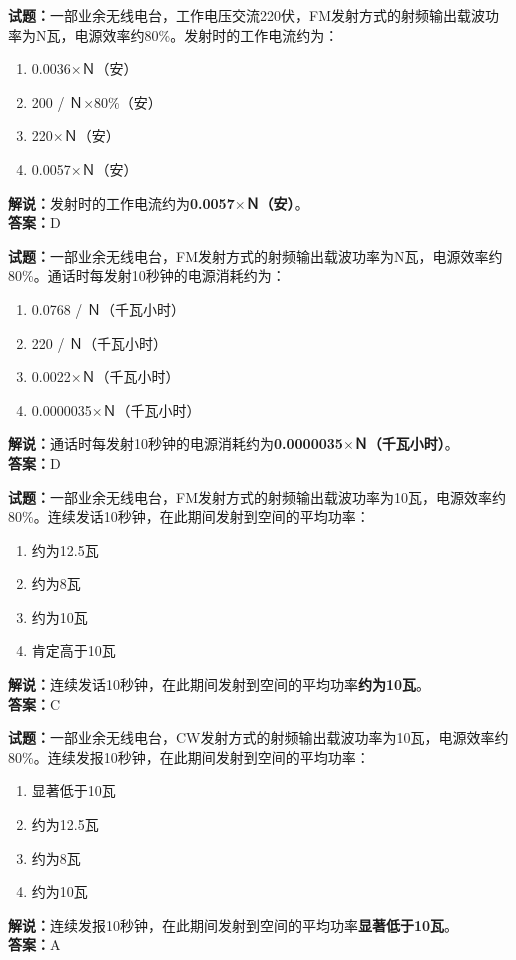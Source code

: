 \documentclass{ctexbook}
\begin{document}
\bigskip


\noindent\textbf{试题：}一部业余无线电台，工作电压交流220伏，FM发射方式的射频输出载波功率为N瓦，电源效率约80\%。发射时的工作电流约为：
\begin{enumerate}[leftmargin=3em]
\item 0.0036$\times$Ｎ（安）
\item 200 / Ｎ$\times$80\%（安）%
\item 220$\times$Ｎ（安）
\item 0.0057$\times$Ｎ（安）
\end{enumerate}
\noindent\textbf{解说：}发射时的工作电流约为\textbf{0.0057$\times$Ｎ（安）}。\\\noindent\textbf{答案：}D




\bigskip


\noindent\textbf{试题：}一部业余无线电台，FM发射方式的射频输出载波功率为N瓦，电源效率约80\%。通话时每发射10秒钟的电源消耗约为：
\begin{enumerate}[leftmargin=3em]
\item 0.0768 / Ｎ（千瓦小时）%
\item 220 / Ｎ（千瓦小时）
\item 0.0022$\times$Ｎ（千瓦小时）
\item 0.0000035$\times$Ｎ（千瓦小时）
\end{enumerate}
\noindent\textbf{解说：}通话时每发射10秒钟的电源消耗约为\textbf{0.0000035$\times$Ｎ（千瓦小时）}。\\\noindent\textbf{答案：}D





\bigskip


\noindent\textbf{试题：}一部业余无线电台，FM发射方式的射频输出载波功率为10瓦，电源效率约80\%。连续发话10秒钟，在此期间发射到空间的平均功率：
\begin{enumerate}[leftmargin=3em]
\item 约为12.5瓦
\item 约为8瓦
\item 约为10瓦
\item 肯定高于10瓦
\end{enumerate}
\noindent\textbf{解说：}连续发话10秒钟，在此期间发射到空间的平均功率\textbf{约为10瓦}。\\\noindent\textbf{答案：}C




\bigskip


\noindent\textbf{试题：}一部业余无线电台，CW发射方式的射频输出载波功率为10瓦，电源效率约80\%。连续发报10秒钟，在此期间发射到空间的平均功率：
\begin{enumerate}[leftmargin=3em]
\item 显著低于10瓦
\item 约为12.5瓦
\item 约为8瓦
\item 约为10瓦
\end{enumerate}
\noindent\textbf{解说：}连续发报10秒钟，在此期间发射到空间的平均功率\textbf{显著低于10瓦}。\\\noindent\textbf{答案：}A
\end{document}
